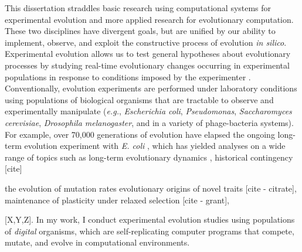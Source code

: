 


This dissertation straddles basic research using computational systems for experimental evolution and more applied research for evolutionary computation.
These two disciplines have divergent goals, but are unified by our ability to implement, observe, and exploit the constructive process of evolution \textit{in silico}.
Experimental evolution allows us to test general hypotheses about evolutionary processes by studying real-time evolutionary changes occurring in experimental populations in response to conditions imposed by the experimenter \citep{kawecki_experimental_2012}.
Conventionally, evolution experiments are performed under laboratory conditions using populations of biological organisms that are tractable to observe and experimentally manipulate (\textit{e.g.}, \textit{Escherichia coli}, \textit{Pseudomonas}, \textit{Saccharomyces cerevisiae}, \textit{Drosophila melanogaster}, and in a variety of phage-bacteria systems). 
For example, over 70,000 generations of evolution have elapsed the ongoing long-term evolution experiment with \textit{E. coli} \citep{barrick_test_2020}, which has yielded analyses on a wide range of topics such as 
long-term evolutionary dynamics \citep{wiser_long-term_2013,good_dynamics_2017}, 
historical contingency [cite]




the evolution of mutation rates
evolutionary origins of novel traits [cite - citrate], 
maintenance of plasticity under relaxed selection [cite - grant],



[X,Y,Z].
In my work, I conduct experimental evolution studies using populations of \textit{digital} organisms, which are self-replicating computer programs that compete, mutate, and evolve in computational environments.



